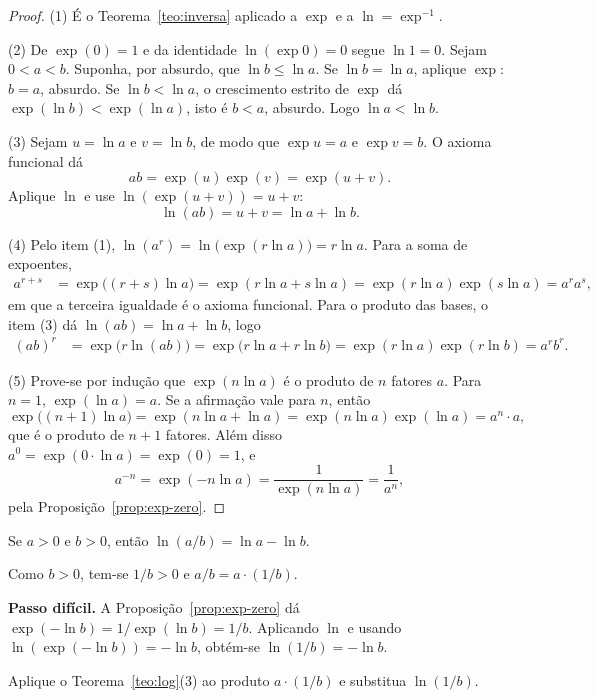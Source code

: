 \documentclass[11pt,a4paper]{article}
\begin{document}
\begin{proof}
(1) É o Teorema~\ref{teo:inversa} aplicado a $\exp$ e a $\ln=\exp^{-1}$.

(2) De $\exp(0)=1$ e da identidade $\ln(\exp 0)=0$ segue $\ln 1=0$. Sejam $0<a<b$. Suponha, por absurdo, que $\ln b\le\ln a$. Se $\ln b=\ln a$, aplique $\exp$: $b=a$, absurdo. Se $\ln b<\ln a$, o crescimento estrito de $\exp$ dá $\exp(\ln b)<\exp(\ln a)$, isto é $b<a$, absurdo. Logo $\ln a<\ln b$.

(3) Sejam $u=\ln a$ e $v=\ln b$, de modo que $\exp u=a$ e $\exp v=b$. O axioma funcional dá
\[
ab=\exp(u)\exp(v)=\exp(u+v).
\]
Aplique $\ln$ e use $\ln(\exp(u+v))=u+v$:
\[
\ln(ab)=u+v=\ln a+\ln b.
\]

(4) Pelo item (1), $\ln(a^r)=\ln\bigl(\exp(r\ln a)\bigr)=r\ln a$. Para a soma de expoentes,
\begin{align*}
a^{r+s}
&=\exp\bigl((r+s)\ln a\bigr)
=\exp(r\ln a+s\ln a)
=\exp(r\ln a)\exp(s\ln a)
=a^ra^s,
\end{align*}
em que a terceira igualdade é o axioma funcional. Para o produto das bases, o item (3) dá $\ln(ab)=\ln a+\ln b$, logo
\begin{align*}
(ab)^r
&=\exp\bigl(r\ln(ab)\bigr)
=\exp\bigl(r\ln a+r\ln b\bigr)
=\exp(r\ln a)\exp(r\ln b)
=a^rb^r.
\end{align*}

(5) Prove-se por indução que $\exp(n\ln a)$ é o produto de $n$ fatores $a$. Para $n=1$, $\exp(\ln a)=a$. Se a afirmação vale para $n$, então
\[
\exp\bigl((n+1)\ln a\bigr)
=\exp(n\ln a+\ln a)
=\exp(n\ln a)\exp(\ln a)
=a^n\cdot a,
\]
que é o produto de $n+1$ fatores. Além disso $a^0=\exp(0\cdot\ln a)=\exp(0)=1$, e
\[
a^{-n}=\exp(-n\ln a)=\frac{1}{\exp(n\ln a)}=\frac{1}{a^n},
\]
pela Proposição~\ref{prop:exp-zero}.
\end{proof}

\begin{lema}\label{lem:quociente}
Se $a>0$ e $b>0$, então $\ln(a/b)=\ln a-\ln b$.
\end{lema}

\begin{esqueleto}
\item Como $b>0$, tem-se $1/b>0$ e $a/b=a\cdot(1/b)$.
\item \textbf{Passo difícil.} A Proposição~\ref{prop:exp-zero} dá $\exp(-\ln b)=1/\exp(\ln b)=1/b$. Aplicando $\ln$ e usando $\ln(\exp(-\ln b))=-\ln b$, obtém-se $\ln(1/b)=-\ln b$.
\item Aplique o Teorema~\ref{teo:log}(3) ao produto $a\cdot(1/b)$ e substitua $\ln(1/b)$.
\end{esqueleto}
\end{document}
